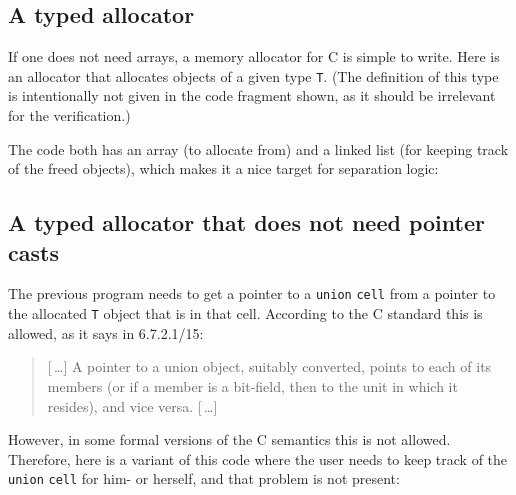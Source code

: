 \documentclass{article}
\begin{document}
\subsection{A typed allocator}
If one does not need arrays, a memory allocator for C is simple to write.
Here is an allocator that allocates objects of a given type \texttt{T}.
(The definition of this type is intentionally not given in the code
fragment shown, as it should be irrelevant for the verification.)

The code both has an array (to allocate from) and a linked list (for keeping
track of the freed objects), which makes it a nice target for separation logic:


\subsection{A typed allocator that does not need pointer casts}
The previous program needs to get a pointer to a \texttt{union} \texttt{cell}
from a pointer to the allocated \texttt{T} object that is in that cell.
According to the C standard \cite{iso:11} this is allowed, as it says in 6.7.2.1/15:
\begin{quote}
[\,\dots]
A pointer to a union object, suitably converted,
points to each of its members (or if a member is a
bit-field, then to the unit in which it resides), and
vice versa.
[\,\dots]
\end{quote}
However, in some formal versions of the C semantics \cite{kre:16} this is not allowed.
Therefore, here is a variant of this code where the user needs to keep
track of the \texttt{union} \texttt{cell} for him- or herself,
and that problem is not present:

\end{document}
